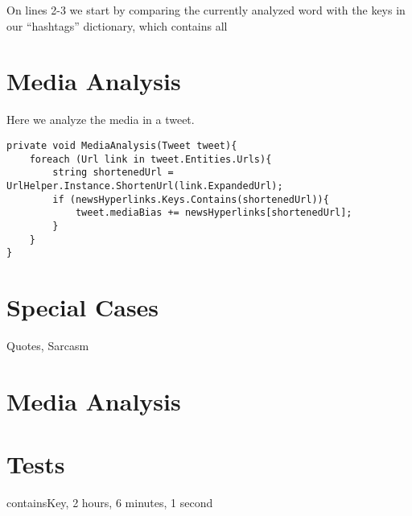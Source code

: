 On lines 2-3 we start by comparing the currently analyzed word with the keys
in our ``hashtags'' dictionary, which contains all

\section{Media Analysis}
Here we analyze the media in a tweet.

\begin{minipage}[H]{\linewidth}
\begin{lstlisting}[caption = Method for handling the media analysis, label = mediaAnalysisExample] 
private void MediaAnalysis(Tweet tweet){
	foreach (Url link in tweet.Entities.Urls){
		string shortenedUrl = UrlHelper.Instance.ShortenUrl(link.ExpandedUrl);
        if (newsHyperlinks.Keys.Contains(shortenedUrl)){
        	tweet.mediaBias += newsHyperlinks[shortenedUrl];
        }
	}
}
\end{lstlisting}
\end{minipage}

\section{Special Cases}\label{AlgorithmCases}
Quotes, Sarcasm

\section{Media Analysis}


\section{Tests}
containsKey, 2 hours, 6 minutes, 1 second
